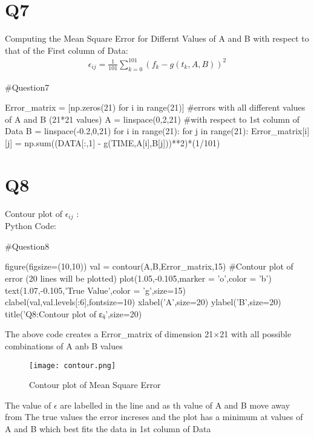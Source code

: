 \documentclass[12pt, a4paper]{report}
\begin{document}
\section*{Q7}
Computing the Mean Square Error for Differnt Values of A and B with respect to that of the First column of Data:\\
\begin{align}
 \epsilon_{ij} = \frac{1}{101}\sum_{k=0}^{101}(f_k - g(t_k,A,B))^2 
\end{align}
\begin{py_code}
#Question7

Error_matrix = [np.zeros(21) for i in range(21)] #errors with all different values of A and B (21*21 values)
A = linspace(0,2,21)                              #with respect to 1st column of Data
B = linspace(-0.2,0,21)
for i in range(21):
    for j in range(21):
        Error_matrix[i][j] = np.sum((DATA[:,1] - g(TIME,A[i],B[j]))**2)*(1/101)
\end{py_code}
\section*{Q8}
Contour plot of $\epsilon_{ij}$ :\\
Python Code:
\begin{py_code}
#Question8

figure(figsize=(10,10))
val = contour(A,B,Error_matrix,15)  #Contour plot of error (20 lines will be plotted)
plot(1.05,-0.105,marker = 'o',color = 'b')
text(1.07,-0.105,'True Value',color = 'g',size=15)
clabel(val,val.levels[:6],fontsize=10)
xlabel('A',size=20)
ylabel('B',size=20)
title('Q8:Contour plot of εᵢⱼ',size=20)
\end{py_code}
The above code creates a Error\_matrix of dimension 21$\times$21 with all possible combinations of A anb B values \\
 \begin{figure}[H]
	\centering
	\texttt{[image: contour.png]}  %
	\caption{Contour plot of Mean Square Error}
	\label{fig:contour}
\end{figure} 
The value of $\epsilon$ are labelled in the line and as th value of A and B move away from The true values the  error increses and the plot has a minimum at values of A and B which best fits the data in 1st column of Data\\
\end{document}
